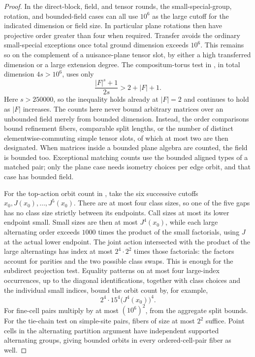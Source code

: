 \begin{proof}
In the direct-block, field, and tensor rounds, the small-special-group,
rotation, and bounded-field cases can all use $10^6$ as the large cutoff
for the indicated dimension or field size.  In particular plane rotations
then have projective order greater than four when required.  Transfer
avoids the ordinary small-special exceptions once total ground dimension
exceeds $10^6$.  This remains so on the complement of a nuisance-plane
tensor slot, by either a high transferred dimension or a large extension
degree.  The compositum-torus test in , in total
dimension $4s>10^6$, uses only
\[
                  \frac{|F|^s+1}{2s}>2+|F|+1.
\]
Here $s>250000$, so the inequality holds already at $|F|=2$ and
continues to hold as $|F|$ increases.
The counts here never bound arbitrary matrices over an unbounded field
merely from bounded dimension.  Instead, the order comparisons bound
refinement fibers, comparable split lengths, or the number of distinct
elementwise-commuting simple tensor slots, of which at most two are then
designated.  When matrices inside a bounded plane algebra are counted,
the field is bounded too.  Exceptional matching counts use the bounded
aligned types of a matched pair; only the plane case needs isometry
choices per edge orbit, and that case has bounded field.

For the top-action orbit count in , take the six
successive cutoffs
$x_0,J(x_0),\ldots,J^5(x_0)$.  There are at most four class sizes, so
one of the five gaps has no class size strictly between its endpoints.
Call sizes at most its lower endpoint small.  Small sizes are then at
most $J^4(x_0)$, while each large alternating order exceeds $1000$ times
the product of the small factorials, using $J$ at the actual lower
endpoint.  The joint action intersected with the product of the large
alternatings has index at most $2^4\cdot2^2$ times those factorials:
the factors account for parities and the two possible class swaps.
This is enough for the subdirect projection test.  Equality patterns on
at most four large-index occurrences, up to the diagonal
identifications, together with class choices and the individual small
indices, bound the orbit count by, for example,
\begin{equation}\label{q:top-orbit-bound}
                        2^4\cdot15^4\bigl(J^4(x_0)\bigr)^4.
\end{equation}
For fine-cell pairs multiply by at most $(10^6)^2$, from the aggregate
split bounds.  For the tie-chain test on simple-site pairs, fibers of
size at most $2^2$ suffice.  Point cells in the alternating partition
argument have independent supported alternating groups, giving bounded
orbits in every ordered-cell-pair fiber as well.


\end{proof}
